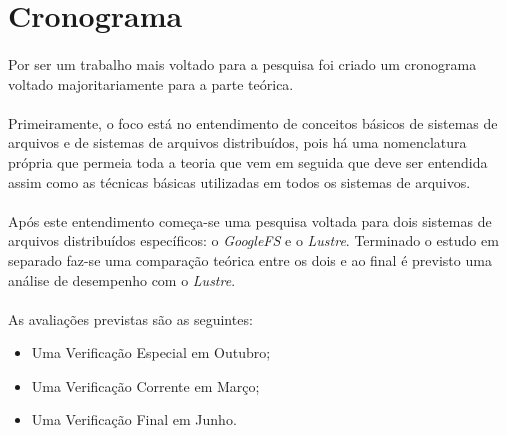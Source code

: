 \section{Cronograma}
\FloatBarrier
\paragraph{}Por ser um trabalho mais voltado para a pesquisa foi criado um cronograma voltado majoritariamente para a parte teórica. 
\paragraph{}Primeiramente, o foco está no entendimento de conceitos básicos de sistemas de arquivos e de sistemas de arquivos distribuídos, pois há uma nomenclatura própria que permeia toda a teoria que vem em seguida que deve ser entendida assim como as técnicas básicas utilizadas em todos os sistemas de arquivos.
\paragraph{}Após este entendimento começa-se uma pesquisa voltada para dois sistemas de arquivos distribuídos específicos: o \textit{GoogleFS} e o \textit{Lustre}. Terminado o estudo em separado faz-se uma comparação teórica entre os dois e ao final é previsto uma análise de desempenho com o \textit{Lustre}.
\paragraph{}As avaliações previstas são as seguintes:
\begin{itemize}
\item Uma Verificação Especial em Outubro;
\item Uma Verificação Corrente em Março;
\item Uma Verificação Final em Junho.
\end{itemize}

